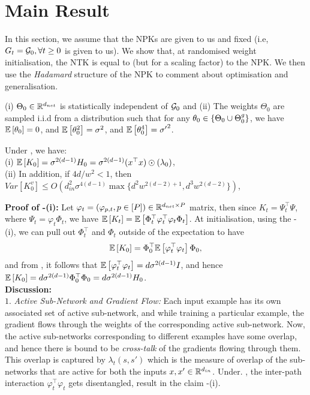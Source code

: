 \section{Main Result}
In this section, we assume that the NPKs are given to us and fixed (i.e, $G_t=\mathcal{G}_0,\forall t\geq 0$ is given to us). We show that, at randomised weight initialisation, the NTK is equal to (but for a scaling factor) to the NPK. We then use the \emph{Hadamard} structure of the NPK to comment about optimisation and generalisation. 
\begin{assumption}\label{assmp:main}
(i) $\Theta_0\in\mathbb{R}^{d_{net}}$  is statistically independent of $\mathcal{G}_0$ and (ii) The weights $\Theta_0$ are sampled i.i.d from a distribution such that for any $\theta_0\in\{\Theta_0\cup {\Theta}^g_0\}$,  we have $\mathbb{E}\left[\theta_0\right]=0$, and  $\mathbb{E}\left[\theta^2_0\right]=\sigma^2$, and $\mathbb{E}\left[\theta^4_0\right]={\sigma'}^2$.
\end{assumption}
\begin{theorem}\label{th:main} Under , we have:\\
(i) $\mathbb{E}\left[K_0\right]=\sigma^{2(d-1)}H_0=\sigma^{2(d-1)}(x^\top x)\odot(\lambda_0)$,\\
(ii) In addition, if ${4d}/{w^2}<1$, then $Var\left[K^v_0\right]\leq O\left(d^2_{in}\sigma^{4(d-1)}\max\{d^2w^{2(d-2)+1}, d^3w^{2(d-2)}\}\right)$,\\
\end{theorem}
\textbf{Proof of -(i):} Let $\varphi_t=(\varphi_{p,t},p\in[P])\in \mathbb{R}^{d_{net}\times P}$ matrix, then since $K_t=\Psi^\top_t\Psi$, where $\Psi_t=\varphi_t \Phi_t$, we have $\mathbb{E}\left[K_t\right]=\mathbb{E}\left[\Phi^\top_t \varphi^\top_t \varphi_t \Phi_t\right]$. At initialisation, using the -(i), we can pull out $\Phi^\top_t$ and $\Phi_t$ outside of the expectation to have \begin{align}\label{eq:pullout}\mathbb{E}\left[K_0\right]=\Phi^\top_0\mathbb{E}\left[ \varphi^\top_t \varphi_t \right]\Phi_0,\end{align} and from , it follows that $\mathbb{E}\left[ \varphi^\top_t \varphi_t \right]=d\sigma^{2(d-1)}I$, and hence $\mathbb{E}\left[K_0\right]=d\sigma^{2(d-1)}\Phi^\top_0\Phi_0=d\sigma^{2(d-1)}H_0$.\\
\textbf{Discussion:}\\
$1.$ \emph{Active Sub-Network and Gradient Flow:}  Each input example has its own associated set of active sub-network, and while training a particular example, the gradient flows through the weights of the corresponding active sub-network. Now, the active sub-networks corresponding to different examples have some overlap, and hence there is bound to be \emph{cross-talk} of the gradients flowing through them. This overlap is captured by $\lambda_t(s,s')$ which is the measure of overlap of the sub-networks that are active for both the inputs $x,x'\in\mathbb{R}^{d_{in}}$. Under. , the inter-path interaction $\varphi^\top_t\varphi_t$ gets disentangled, result in the claim -(i).\\
